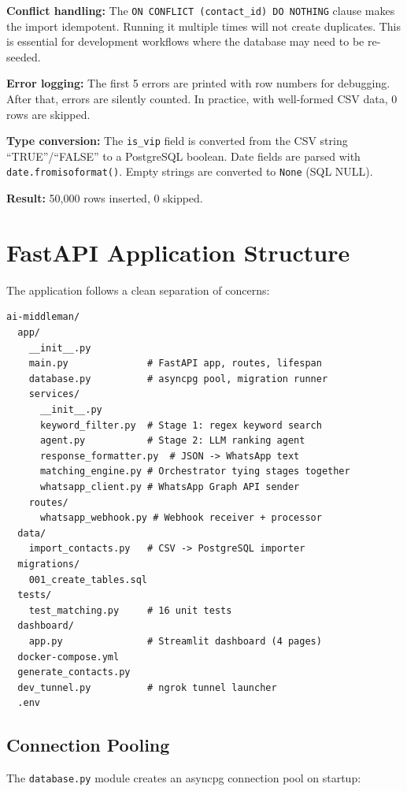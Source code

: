 \documentclass[12pt, a4paper]{report}
\begin{document}
\textbf{Conflict handling:} The \texttt{ON CONFLICT (contact\_id) DO NOTHING} clause makes the import idempotent. Running it multiple times will not create duplicates. This is essential for development workflows where the database may need to be re-seeded.

\textbf{Error logging:} The first 5 errors are printed with row numbers for debugging. After that, errors are silently counted. In practice, with well-formed CSV data, 0 rows are skipped.

\textbf{Type conversion:} The \texttt{is\_vip} field is converted from the CSV string ``TRUE''/``FALSE'' to a PostgreSQL boolean. Date fields are parsed with \texttt{date.fromisoformat()}. Empty strings are converted to \texttt{None} (SQL NULL).

\textbf{Result:} 50,000 rows inserted, 0 skipped.

\section{FastAPI Application Structure}

The application follows a clean separation of concerns:

\begin{verbatim}
ai-middleman/
  app/
    __init__.py
    main.py              # FastAPI app, routes, lifespan
    database.py          # asyncpg pool, migration runner
    services/
      __init__.py
      keyword_filter.py  # Stage 1: regex keyword search
      agent.py           # Stage 2: LLM ranking agent
      response_formatter.py  # JSON -> WhatsApp text
      matching_engine.py # Orchestrator tying stages together
      whatsapp_client.py # WhatsApp Graph API sender
    routes/
      whatsapp_webhook.py # Webhook receiver + processor
  data/
    import_contacts.py   # CSV -> PostgreSQL importer
  migrations/
    001_create_tables.sql
  tests/
    test_matching.py     # 16 unit tests
  dashboard/
    app.py               # Streamlit dashboard (4 pages)
  docker-compose.yml
  generate_contacts.py
  dev_tunnel.py          # ngrok tunnel launcher
  .env
\end{verbatim}

\subsection{Connection Pooling}

The \texttt{database.py} module creates an asyncpg connection pool on startup:
\end{document}
